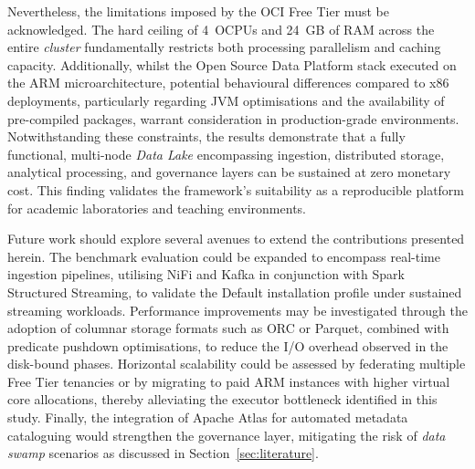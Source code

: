 Nevertheless, the limitations imposed by the OCI Free Tier must be acknowledged. The hard ceiling of 
4~OCPUs and 24~GB of RAM across the entire \emph{cluster} fundamentally restricts both processing 
parallelism and caching capacity. Additionally, whilst the Open Source Data Platform stack executed on 
the ARM microarchitecture, potential behavioural differences compared to x86 
deployments, particularly regarding JVM optimisations and the availability of pre-compiled 
packages, warrant consideration in production-grade environments. Notwithstanding these constraints, 
the results demonstrate that a fully functional, multi-node \emph{Data Lake} encompassing ingestion, 
distributed storage, analytical processing, and governance layers can be sustained at zero monetary 
cost. This finding validates the framework's suitability as a reproducible platform for academic 
laboratories and teaching environments.

Future work should explore several avenues to extend the contributions presented herein. The benchmark evaluation could 
be expanded to encompass real-time ingestion pipelines, utilising NiFi and Kafka in conjunction with 
Spark Structured Streaming, to validate the Default installation profile under sustained 
streaming workloads. Performance improvements may be investigated through the adoption of columnar 
storage formats such as ORC or Parquet, combined with predicate pushdown optimisations, to reduce 
the I/O overhead observed in the disk-bound phases. Horizontal scalability could be assessed by 
federating multiple Free Tier tenancies or by migrating to paid ARM instances with higher virtual 
core allocations, thereby alleviating the executor bottleneck identified in this study. Finally, 
the integration of Apache Atlas for automated metadata cataloguing would strengthen the governance 
layer, mitigating the risk of \emph{data swamp} scenarios as discussed in Section~\ref{sec:literature}.

